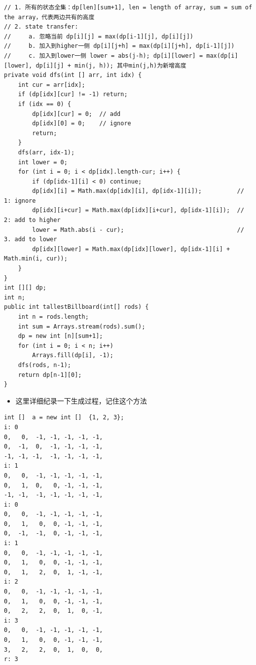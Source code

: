 \documentclass[9pt, b5paaper]{book}
\begin{document}
\begin{verbatim}
// 1. 所有的状态全集：dp[len][sum+1], len = length of array, sum = sum of the array，代表两边共有的高度
// 2. state transfer:
//     a. 忽略当前 dp[i][j] = max(dp[i-1][j], dp[i][j])
//     b. 加入到higher一侧 dp[i][j+h] = max(dp[i][j+h], dp[i-1][j])
//     c. 加入到lower一侧 lower = abs(j-h); dp[i][lower] = max(dp[i][lower], dp[i][j] + min(j, h)); 其中min(j,h)为新增高度
private void dfs(int [] arr, int idx) {
    int cur = arr[idx];
    if (dp[idx][cur] != -1) return;
    if (idx == 0) {
        dp[idx][cur] = 0;  // add
        dp[idx][0] = 0;    // ignore
        return;
    }
    dfs(arr, idx-1);
    int lower = 0;
    for (int i = 0; i < dp[idx].length-cur; i++) {
        if (dp[idx-1][i] < 0) continue;
        dp[idx][i] = Math.max(dp[idx][i], dp[idx-1][i]);          // 1: ignore
        dp[idx][i+cur] = Math.max(dp[idx][i+cur], dp[idx-1][i]);  // 2: add to higher
        lower = Math.abs(i - cur);                                // 3. add to lower
        dp[idx][lower] = Math.max(dp[idx][lower], dp[idx-1][i] + Math.min(i, cur)); 
    }
}
int [][] dp;
int n;
public int tallestBillboard(int[] rods) { 
    int n = rods.length;
    int sum = Arrays.stream(rods).sum();
    dp = new int [n][sum+1];
    for (int i = 0; i < n; i++) 
        Arrays.fill(dp[i], -1);
    dfs(rods, n-1);
    return dp[n-1][0];
}
\end{verbatim}
\begin{itemize}
\item 这里详细纪录一下生成过程，记住这个方法
\end{itemize}
\begin{verbatim}
int []  a = new int []  {1, 2, 3};
i: 0
0,   0,  -1, -1, -1, -1, -1,
0,  -1,  0,  -1, -1, -1, -1,
-1, -1, -1,  -1, -1, -1, -1,
i: 1
0,   0,  -1, -1, -1, -1, -1,
0,   1,  0,   0, -1, -1, -1,
-1, -1,  -1, -1, -1, -1, -1,
i: 0
0,   0,  -1, -1, -1, -1, -1,
0,   1,   0,  0, -1, -1, -1,
0,  -1,  -1,  0, -1, -1, -1,
i: 1
0,   0,  -1, -1, -1, -1, -1,
0,   1,   0,  0, -1, -1, -1,
0,   1,   2,  0,  1, -1, -1,
i: 2
0,   0,  -1, -1, -1, -1, -1,
0,   1,   0,  0, -1, -1, -1,
0,   2,   2,  0,  1,  0, -1,
i: 3
0,   0,  -1, -1, -1, -1, -1,
0,   1,   0,  0, -1, -1, -1,
3,   2,   2,  0,  1,  0,  0,
r: 3
\end{verbatim}
\end{document}
